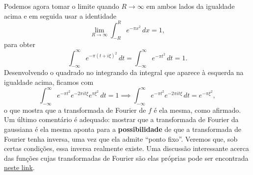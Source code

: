         Podemos agora tomar o limite quando $R\to\infty$ em ambos
        lados da igualdade acima e em seguida usar a identidade
        \begin{equation*}
            \lim_{R\to\infty} \int_{-R}^R e^{-\pi x^2} \, dx = 1,
        \end{equation*}
        para obter
        \begin{equation*}
            \int_{-\infty}^{\infty} e^{-\pi(t+i\xi)^2}\, dt
            =
            \int_{-\infty}^{\infty} e^{-\pi t^2}\, dt = 1.
        \end{equation*}
        Desenvolvendo o quadrado no integrando da integral que aparece
        à esquerda na igualdade acima, ficamos com
        \begin{equation*}
            \int_{-\infty}^{\infty} e^{-\pi t^2} e^{-2\pi i t\xi }  e^{\pi\xi^2}\, dt = 1
            \implies
            \int_{-\infty}^{\infty} e^{-\pi t^2} e^{-2\pi i t\xi } \, dt = e^{-\pi\xi^2},
        \end{equation*}
        o que mostra que a transformada de Fourier de $f$ é ela mesma, como afirmado.
        Um último comentário é adequado: mostrar que a transformada de Fourier da
        gaussiana é ela mesma aponta para a {\bf possibilidade} de que a transformada
        de Fourier tenha inversa, uma vez que ela admite ``ponto fixo''. Veremos que,
        sob certas condições, essa inversa realmente existe. Uma discussão interessante
        acerca das funções cujas transformadas de Fourier são elas próprias pode ser
        encontrada \href{https://math.stackexchange.com/questions/728670/functions-that-are-their-own-fourier-transform}{neste link}.
